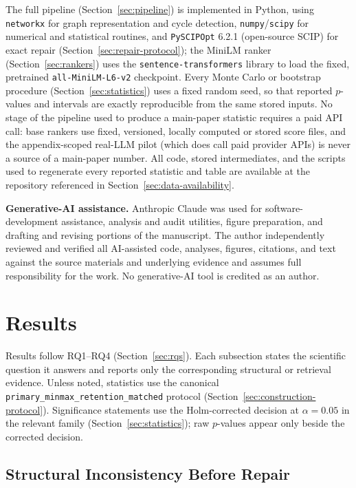\documentclass[pdflatex,sn-basic,Numbered]{sn-jnl}
\begin{document}
The full pipeline (Section~\ref{sec:pipeline}) is implemented in Python,
using \texttt{networkx} for graph representation and cycle detection,
\texttt{numpy}/\texttt{scipy} for numerical and statistical routines, and
\texttt{PySCIPOpt} 6.2.1 (open-source SCIP) for exact repair
(Section~\ref{sec:repair-protocol}); the MiniLM ranker
(Section~\ref{sec:rankers}) uses the \texttt{sentence-transformers}
library to load the fixed, pretrained \texttt{all-MiniLM-L6-v2} checkpoint.
Every Monte Carlo or bootstrap procedure (Section~\ref{sec:statistics})
uses a fixed random seed, so that reported $p$-values and intervals are
exactly reproducible from the same stored inputs. No stage of the pipeline
used to produce a main-paper statistic requires a paid API call: base
rankers use fixed, versioned, locally computed or stored score files, and
the appendix-scoped real-LLM pilot (which does call paid provider APIs)
is never a source of a main-paper number. All code, stored intermediates,
and the scripts used to regenerate every reported statistic and table are
available at the repository referenced in
Section~\ref{sec:data-availability}.

\textbf{Generative-AI assistance.} Anthropic Claude was used for
software-development assistance, analysis and audit utilities, figure
preparation, and drafting and revising portions of the manuscript. The
author independently reviewed and verified all AI-assisted code,
analyses, figures, citations, and text against the source materials and
underlying evidence and assumes full responsibility for the work. No
generative-AI tool is credited as an author.

\section{Results}
\label{sec:results}

Results follow RQ1--RQ4 (Section~\ref{sec:rqs}). Each subsection states the
scientific question it answers and reports only the corresponding
structural or retrieval evidence. Unless noted, statistics use the
canonical \texttt{primary\_minmax\_retention\_matched} protocol
(Section~\ref{sec:construction-protocol}). Significance statements use the
Holm-corrected decision at $\alpha=0.05$ in the relevant family
(Section~\ref{sec:statistics}); raw $p$-values appear only beside the
corrected decision.

\subsection{Structural Inconsistency Before Repair}
\label{sec:results-structure}
\end{document}
